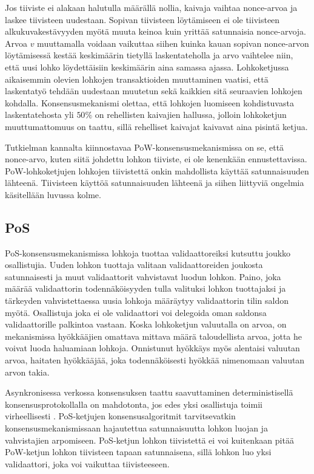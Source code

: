 Jos tiiviste ei alakaan halutulla määrällä nollia, kaivaja vaihtaa nonce-arvoa ja laskee tiivisteen uudestaan. Sopivan tiivisteen löytämiseen ei ole tiivisteen alkukuvakestävyyden myötä muuta keinoa kuin yrittää satunnaisia nonce-arvoja. Arvoa $v$ muuttamalla voidaan vaikuttaa siihen kuinka kauan sopivan nonce-arvon löytämisessä kestää keskimäärin tietyllä laskentateholla ja arvo vaihtelee niin, että uusi lohko löydettäisiin keskimäärin aina samassa ajassa. Lohkoketjussa aikaisemmin olevien lohkojen transaktioiden muuttaminen vaatisi, että laskentatyö tehdään uudestaan muutetun sekä kaikkien sitä seuraavien lohkojen kohdalla. Konsensusmekanismi olettaa, että lohkojen luomiseen kohdistuvasta laskentatehosta yli $50\%$ on rehellisten kaivajien hallussa, jolloin lohkoketjun muuttumattomuus on taattu, sillä rehelliset kaivajat kaivavat aina pisintä ketjua.

Tutkielman kannalta kiinnostavaa PoW-konsensusmekanismissa on se, että nonce-arvo, kuten siitä johdettu lohkon tiiviste, ei ole kenenkään ennustettavissa. PoW-lohkoketjujen lohkojen tiivistettä onkin mahdollista käyttää satunnaisuuden lähteenä. Tiivisteen käyttöä satunnaisuuden lähteenä ja siihen liittyviä ongelmia käsitellään luvussa kolme.

\subsection{PoS}

PoS-konsensusmekanismissa lohkoja tuottaa validaattoreiksi kutsuttu joukko osallistujia. Uuden lohkon tuottaja valitaan validaattoreiden joukosta satunnaisesti ja muut validaattorit vahvistavat luodun lohkon. Paino, joka määrää validaattorin todennäköisyyden tulla valituksi lohkon tuottajaksi ja tärkeyden vahvistettaessa uusia lohkoja määräytyy validaattorin tilin saldon myötä. Osallistuja joka ei ole validaattori voi delegoida oman saldonsa validaattorille palkintoa vastaan. Koska lohkoketjun valuutalla on arvoa, on mekanismissa hyökkääjien omattava mittava määrä taloudellista arvoa, jotta he voivat luoda haluamiaan lohkoja. Onnistunut hyökkäys myös alentaisi valuutan arvoa, haitaten hyökkääjää, joka todennäköisesti hyökkää nimenomaan valuutan arvon takia.

Asynkronisessa verkossa konsensuksen taattu saavuttaminen deterministisellä konsensusprotokollalla on mahdotonta, jos edes yksi osallistuja toimii virheellisesti \cite{fischer_impossibility_1985}. PoS-ketjujen konsensusalgoritmit tarvitsevatkin konsensusmekanismissaan hajautettua satunnaisuutta lohkon luojan ja vahvistajien arpomiseen. PoS-ketjun lohkon tiivistettä ei voi kuitenkaan pitää PoW-ketjun lohkon tiivisteen tapaan satunnaisena, sillä lohkon luo yksi validaattori, joka voi vaikuttaa tiivisteeseen.

